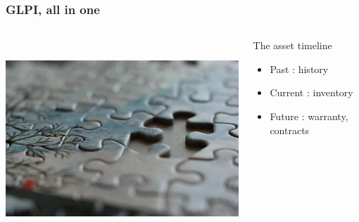 \documentclass{beamer}
\begin{document}
\begin{frame}


    \frametitle{GLPI, all in one}
 \begin{columns}
 \begin{column}{0.45\textwidth}
         \includegraphics[height=7.5cm]{./pics/glpithelink.jpg}
 \end{column}
 \begin{column}{0.65\textwidth}
    \begin{block}{The asset timeline}
        \begin{itemize}
            \item Past : history
            \item Current : inventory
            \item Future : warranty, contracts
        \end{itemize}

    \end{block}

 \end{column}
\end{columns}
\end{frame}
\end{document}
